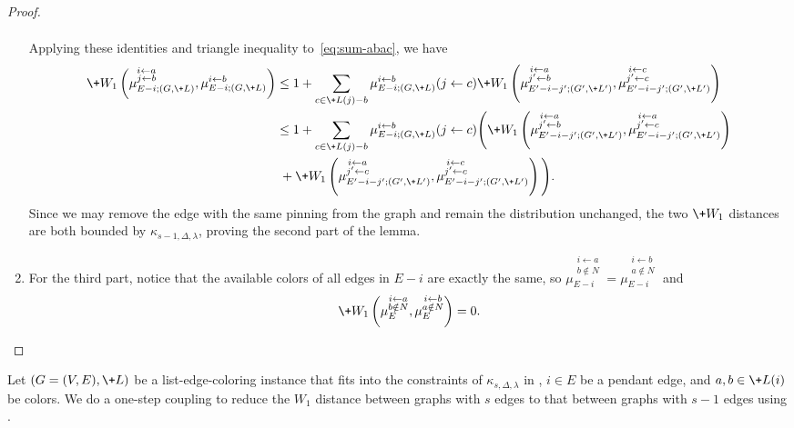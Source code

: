 \documentclass[a4paper,11pt]{article}
\newcommand{\pin}{\leftarrow}
\newcommand{\W}[1]{\+W_1\left(#1\right)}
\begin{document}
\begin{proof}
\begin{enumerate}
\begin{align*}
    \end{align*}
    Applying these identities and triangle inequality to~\eqref{eq:sum-abac}, we have
    \begin{align*}
    \W{\mu_{E-i; (G, \+L)}^{\substack{i\pin a\\ j\pin b}} , \mu_{E-i;(G, \+L)}^{i\pin b}}
    &\le
    1+
    \sum_{c\in\+L(j)-b}
    \mu_{E-i;(G, \+L)}^{i\pin b}(j\pin c)
    \W{
    \mu_{E'-i-j'; (G', \+L')}^{\substack{i\pin a\\ j'\pin b}}
    ,
    \mu_{E'-i-j'; (G', \+L')}^{\substack{i\pin c\\ j'\pin c}}
    }
    \\&\le
    1+
    \sum_{c\in\+L(j)-b}
    \mu_{E-i;(G, \+L)}^{i\pin b}(j\pin c)
    \Bigg(
    \W{
    \mu_{E'-i-j'; (G', \+L')}^{\substack{i\pin a\\ j'\pin b}}
    ,
    \mu_{E'-i-j'; (G', \+L')}^{\substack{i\pin a\\ j'\pin c}}
    }
    \\&\;+
    \W{
    \mu_{E'-i-j'; (G', \+L')}^{\substack{i\pin a\\ j'\pin c}}
    ,
    \mu_{E'-i-j'; (G', \+L')}^{\substack{i\pin c\\ j'\pin c}}
    }
    \Bigg).
    \end{align*}
    Since we may remove the edge with the same pinning from the graph and remain the distribution unchanged,
    the two $\+W_1$ distances are both bounded by $\kappa_{s-1, \Delta, \lambda}$, proving the second part of 
    the lemma.

    \item For the third part, notice that the available colors of all edges in $E-i$ are 
    exactly the same, so ${\mu_{E-i}^{\substack{i\pin a\\b\notin N}}}={\mu_{E-i}^{\substack{i\pin b\\a\notin N}}}$
    and 
\[
        \W{\mu_{E}^{\substack{i\pin a\\b\notin N}},\mu_{E}^{\substack{i\pin b\\a\notin N}}}
        =0.
        \qedhere
\]
    \end{enumerate}
\end{proof}

Let $(G=(V, E), \+L)$ be a list-edge-coloring instance that fits into the constraints of $\kappa_{s, \Delta, \lambda}$ in , $i\in E$ be a pendant edge, and $a, b\in \+L(i)$ be colors. We do a one-step coupling to reduce the $W_1$ distance between graphs with $s$ edges to that between graphs with $s-1$ edges using .
\end{document}
